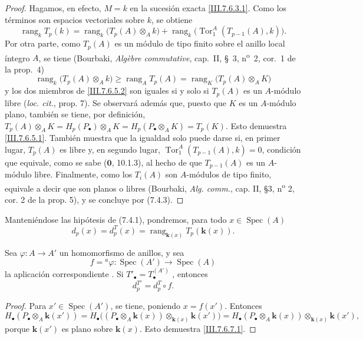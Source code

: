 \begin{proof}
Hagamos, en efecto, $M=k$ en la sucesión exacta \eqref{III.7.6.3.1}. Como los
términos son espacios vectoriales sobre $k$, se obtiene
\[
  \operatorname{rang}_k T_p(k)
  =
  \operatorname{rang}_k\bigl(T_p(A)\otimes_A k\bigr)
  +
  \operatorname{rang}_k\bigl(\operatorname{Tor}_1^A(T_{p-1}(A),k)\bigr).
\]
Por otra parte, como $T_p(A)$ es un módulo de tipo finito sobre el
anillo local íntegro $A$, se tiene (Bourbaki,
\emph{Alg\`ebre commutative}, cap.~II, \S~3,
n\textsuperscript{o}~2, cor.~1 de la prop.~4)
\[
  \operatorname{rang}_k\bigl(T_p(A)\otimes_A k\bigr)
  \geq
  \operatorname{rang}_A T_p(A)
  =
  \operatorname{rang}_K\bigl(T_p(A)\otimes_A K\bigr)
  \tag{7.6.5.2}\label{III.7.6.5.2.fr}
\]
y los dos miembros de \eqref{III.7.6.5.2} son iguales si y solo si
$T_p(A)$ es un $A$-módulo libre (\emph{loc. cit.}, prop. 7). Se observará además que, puesto que $K$ es un $A$-módulo plano, también se tiene, por definición,
$T_p(A)\otimes_A K=H_p(P_\bullet)\otimes_A K=H_p(P_\bullet\otimes_A K)=T_p(K)$.
Esto demuestra \eqref{III.7.6.5.1}. También muestra que la igualdad
solo puede darse si, en primer lugar, $T_p(A)$ es libre y, en segundo
lugar,
$\operatorname{Tor}_1^A(T_{p-1}(A),k)=0$, condición que
equivale, como se sabe ($\mathbf{0}$, 10.1.3), al hecho de que $T_{p-1}(A)$ es un $A$-módulo libre. Finalmente, como los $T_i(A)$ son $A$-módulos de tipo finito,
equivale a decir que son planos o libres (Bourbaki,
\emph{Alg. comm.}, cap. II, \S 3, n\textsuperscript{o} 2, cor. 2 de la prop.
5), y se concluye por (7.4.3).
\end{proof}

\begin{env}[7.6.6]
Manteniéndose las hipótesis de (7.4.1), pondremos, para todo $x\in\operatorname{Spec}(A)$ \[
  d_p(x)=d_p^T(x)=\operatorname{rang}_{\mathbf{k}(x)}T_p(\boldsymbol{k}(x)).
  \tag{7.6.6.1}\label{III.7.6.6.1.fr}
\]
\end{env}

\begin{lemma}[7.6.7]
\label{III.7.6.7}
Sea $\varphi:A\to A'$ un homomorfismo de anillos, y sea
\[
  f={}^a\!\varphi:
  \operatorname{Spec}(A')\longrightarrow\operatorname{Spec}(A)
\]
la aplicación correspondiente \textup{}. Si
$T'_\bullet=T_\bullet^{(A')}$ \textup{}, entonces
\[
  d_p^{T'}=d_p^T\circ f.
  \tag{7.6.7.1}\label{III.7.6.7.1.fr}
\]
\end{lemma}

\begin{proof}
Para $x'\in\operatorname{Spec}(A')$, se tiene, poniendo $x=f(x')$. Entonces
\[
  H_\bullet(P_\bullet\otimes_A\boldsymbol{k}(x'))
  =
  H_\bullet\bigl((P_\bullet\otimes_A\boldsymbol{k}(x))
    \otimes_{\mathbf{k}(x)}\boldsymbol{k}(x')\bigr)
  =
  H_\bullet(P_\bullet\otimes_A\boldsymbol{k}(x))
    \otimes_{\mathbf{k}(x)}\boldsymbol{k}(x'),
\]
porque $\boldsymbol{k}(x')$ es plano sobre $\boldsymbol{k}(x)$. Esto demuestra
\eqref{III.7.6.7.1}.
\end{proof}

